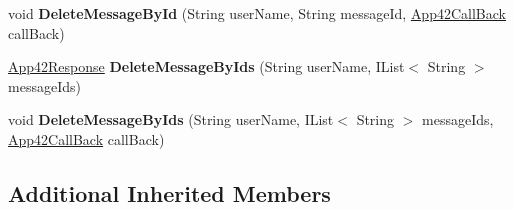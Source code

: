 \begin{DoxyCompactItemize}
\item 
\hypertarget{classcom_1_1shephertz_1_1app42_1_1paas_1_1sdk_1_1csharp_1_1buddy_1_1_buddy_service_a0bfaab3c05ba09a488715e960901a70f}{void {\bfseries Delete\+Message\+By\+Id} (String user\+Name, String message\+Id, \hyperlink{interfacecom_1_1shephertz_1_1app42_1_1paas_1_1sdk_1_1csharp_1_1_app42_call_back}{App42\+Call\+Back} call\+Back)}\label{classcom_1_1shephertz_1_1app42_1_1paas_1_1sdk_1_1csharp_1_1buddy_1_1_buddy_service_a0bfaab3c05ba09a488715e960901a70f}

\item 
\hypertarget{classcom_1_1shephertz_1_1app42_1_1paas_1_1sdk_1_1csharp_1_1buddy_1_1_buddy_service_a319c32e1e047791a51dda59399087d37}{\hyperlink{classcom_1_1shephertz_1_1app42_1_1paas_1_1sdk_1_1csharp_1_1_app42_response}{App42\+Response} {\bfseries Delete\+Message\+By\+Ids} (String user\+Name, I\+List$<$ String $>$ message\+Ids)}\label{classcom_1_1shephertz_1_1app42_1_1paas_1_1sdk_1_1csharp_1_1buddy_1_1_buddy_service_a319c32e1e047791a51dda59399087d37}

\item 
\hypertarget{classcom_1_1shephertz_1_1app42_1_1paas_1_1sdk_1_1csharp_1_1buddy_1_1_buddy_service_ad184145b7057db2fc41964f34760da19}{void {\bfseries Delete\+Message\+By\+Ids} (String user\+Name, I\+List$<$ String $>$ message\+Ids, \hyperlink{interfacecom_1_1shephertz_1_1app42_1_1paas_1_1sdk_1_1csharp_1_1_app42_call_back}{App42\+Call\+Back} call\+Back)}\label{classcom_1_1shephertz_1_1app42_1_1paas_1_1sdk_1_1csharp_1_1buddy_1_1_buddy_service_ad184145b7057db2fc41964f34760da19}

\end{DoxyCompactItemize}
\subsection*{Additional Inherited Members}


